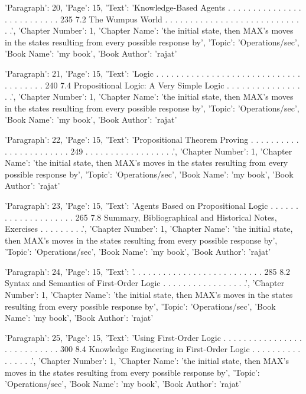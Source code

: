 {'Paragraph': 20, 'Page': 15, 'Text': 'Knowledge-Based Agents . . . . . . . . . . . . . . . . . . . . . . . . . . 235 7.2 The Wumpus World . . . . . . . . . . . . . . . . . . . . . . . . . . . . .', 'Chapter Number': 1, 'Chapter Name': 'the initial state, then MAX’s moves in the states resulting from every possible response by', 'Topic': 'Operations/sec', 'Book Name': 'my book', 'Book Author': 'rajat'}

{'Paragraph': 21, 'Page': 15, 'Text': 'Logic . . . . . . . . . . . . . . . . . . . . . . . . . . . . . . . . . . . . . 240 7.4 Propositional Logic: A Very Simple Logic . . . . . . . . . . . . . . . . .', 'Chapter Number': 1, 'Chapter Name': 'the initial state, then MAX’s moves in the states resulting from every possible response by', 'Topic': 'Operations/sec', 'Book Name': 'my book', 'Book Author': 'rajat'}

{'Paragraph': 22, 'Page': 15, 'Text': 'Propositional Theorem Proving . . . . . . . . . . . . . . . . . . . . . . . 249 . . . . . . . . . . . . . . . . . .', 'Chapter Number': 1, 'Chapter Name': 'the initial state, then MAX’s moves in the states resulting from every possible response by', 'Topic': 'Operations/sec', 'Book Name': 'my book', 'Book Author': 'rajat'}

{'Paragraph': 23, 'Page': 15, 'Text': 'Agents Based on Propositional Logic . . . . . . . . . . . . . . . . . . . . 265 7.8 Summary, Bibliographical and Historical Notes, Exercises . . . . . . . . .', 'Chapter Number': 1, 'Chapter Name': 'the initial state, then MAX’s moves in the states resulting from every possible response by', 'Topic': 'Operations/sec', 'Book Name': 'my book', 'Book Author': 'rajat'}

{'Paragraph': 24, 'Page': 15, 'Text': '. . . . . . . . . . . . . . . . . . . . . . . . . . 285 8.2 Syntax and Semantics of First-Order Logic . . . . . . . . . . . . . . . . .', 'Chapter Number': 1, 'Chapter Name': 'the initial state, then MAX’s moves in the states resulting from every possible response by', 'Topic': 'Operations/sec', 'Book Name': 'my book', 'Book Author': 'rajat'}

{'Paragraph': 25, 'Page': 15, 'Text': 'Using First-Order Logic . . . . . . . . . . . . . . . . . . . . . . . . . . . 300 8.4 Knowledge Engineering in First-Order Logic . . . . . . . . . . . . . . . .', 'Chapter Number': 1, 'Chapter Name': 'the initial state, then MAX’s moves in the states resulting from every possible response by', 'Topic': 'Operations/sec', 'Book Name': 'my book', 'Book Author': 'rajat'}


